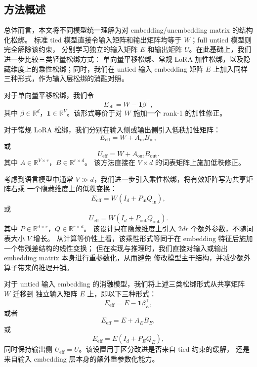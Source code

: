 \subsection{方法概述}

总体而言，本文将不同模型统一理解为对 embedding/unembedding matrix 的结构化松绑。
标准 tied 模型直接令输入矩阵和输出矩阵均等于 $W$；full untied 模型则完全解除该约束，
分别学习独立的输入矩阵 $E$ 和输出矩阵 $U$。在此基础上，我们进一步比较三类轻量松绑方式：
单向量平移松绑、常规 LoRA 加性松绑，以及隐藏维度上的乘性松绑；同时，我们在 untied
输入 embedding 矩阵 $E$ 上加入同样三种形式，作为输入层松绑的消融对照。

对于单向量平移松绑，我们令
\begin{equation}
    E_{\mathrm{eff}} = W-\mathbf{1}\beta^\top,
\end{equation}
其中 $\beta\in\mathbb{R}^{d}$，$\mathbf{1}\in\mathbb{R}^{V}$。该形式等价于对 $W$
施加一个 rank-1 的加性修正。

对于常规 LoRA 松绑，我们分别在输入侧或输出侧引入低秩加性矩阵：
\begin{equation}
    E_{\mathrm{eff}} = W+A_{\mathrm{in}}B_{\mathrm{in}},
\end{equation}
或
\begin{equation}
    U_{\mathrm{eff}} = W+A_{\mathrm{out}}B_{\mathrm{out}}.
\end{equation}
其中 $A\in\mathbb{R}^{V\times r}$，$B\in\mathbb{R}^{r\times d}$。
该方法直接在 $V\times d$ 的词表矩阵上施加低秩修正。

考虑到语言模型中通常 $V\gg d$，我们进一步引入乘性松绑，将有效矩阵写为共享矩阵右乘
一个隐藏维度上的低秩变换：
\begin{equation}
    E_{\mathrm{eff}} = W(I_d+P_{\mathrm{in}}Q_{\mathrm{in}}),
\end{equation}
或
\begin{equation}
    U_{\mathrm{eff}} = W(I_d+P_{\mathrm{out}}Q_{\mathrm{out}}).
\end{equation}
其中 $P\in\mathbb{R}^{d\times r}$，$Q\in\mathbb{R}^{r\times d}$。
该设计只在隐藏维度上引入 $2dr$ 个额外参数，不随词表大小 $V$ 增长。
从计算等价性上看，该乘性形式等同于在 embedding 特征后施加一个带残差结构的线性变换；
但在实现与推理时，我们直接对输入或输出 embedding matrix 本身进行重参数化，从而避免
修改模型主干结构，并减少额外算子带来的推理开销。

对于 untied 输入 embedding 的消融模型，我们将上述三类松绑形式从共享矩阵 $W$ 迁移到
独立输入矩阵 $E$ 上，即以下三种形式：
\begin{equation}
    E_{\mathrm{eff}} = E-\mathbf{1}\beta_E^\top,
\end{equation}
或者
\begin{equation}
    E_{\mathrm{eff}} = E+A_EB_E,
\end{equation}
或
\begin{equation}
    E_{\mathrm{eff}} = E(I_d+P_EQ_E),
\end{equation}
同时保持输出侧 $U_{\mathrm{eff}}=U$。该设置用于区分改进是否来自 tied 约束的缓解，
还是来自输入 embedding 层本身的额外重参数化能力。
